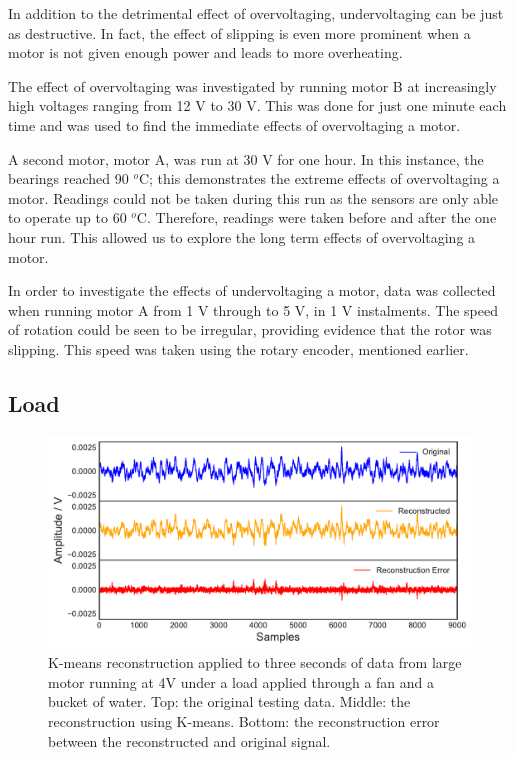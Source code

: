 In addition to the detrimental effect of overvoltaging, undervoltaging can be just as destructive. In fact, the effect of slipping is even more prominent when a motor is not given enough power and leads to more overheating.


The effect of overvoltaging  was investigated by running motor B at increasingly high voltages ranging from 12 V to 30 V. This was done for just one minute each time and was used to find the immediate effects of overvoltaging a motor.
    

A second motor, motor A, was run at 30 V for one hour. In this instance, the bearings reached 90 $^o$C; this demonstrates the extreme effects of overvoltaging a motor. Readings could not be taken during this run as the sensors are only able to operate %
up to 60 $^o$C. %
Therefore, readings were taken before and after the one hour run. This allowed us to explore the long term effects of overvoltaging a motor.


In order to investigate the effects of undervoltaging a motor, data was collected when running motor A from 1 V through to 5 V, in 1 V instalments. The speed of rotation could be seen to be irregular, providing evidence that the rotor was slipping. This speed was taken using the rotary encoder, mentioned earlier. %


\subsection{Load}

\begin{figure}[t]
    \includegraphics[width=1.0\textwidth]{fig/kmeans_large_4Vwater.pdf}
    \caption[K-means Large Motor Reconstruction In Water]{K-means reconstruction applied to three seconds of data from large motor running at 4V under a load applied through a fan and a bucket of water. Top: the original testing data. Middle: the reconstruction using K-means. Bottom: the reconstruction error between the reconstructed and original signal.}
    \label{fig:kmeans_large4Vwater}
\end{figure}

